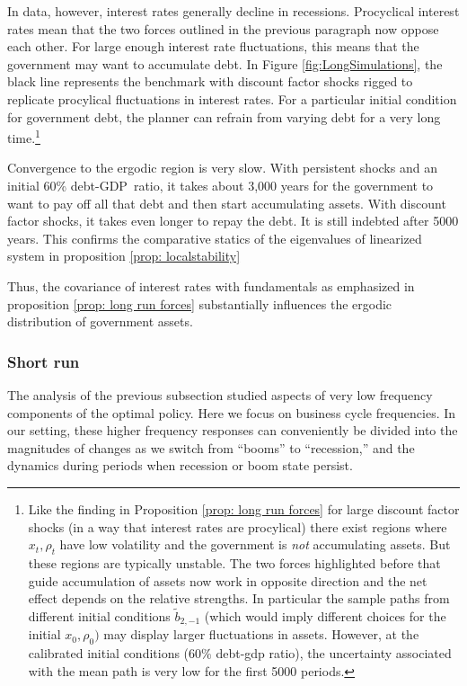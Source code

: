 \documentclass[thmsb,11pt]{article}
\begin{document}
In data, however, interest rates  generally decline in recessions. Procyclical interest rates mean that the
two forces outlined in the previous paragraph now oppose each other.  For  large enough interest rate fluctuations, this means that
the
government may want to accumulate debt. In Figure \ref{fig:LongSimulations}, the
black line represents the benchmark with discount factor shocks rigged to
replicate  procylical fluctuations in interest rates. For a particular initial condition for government debt,
the planner can refrain from varying debt for a very  long time.\footnote{Like the finding in Proposition \ref{prop: long run forces} for large discount factor shocks (in a way that interest rates are procylical)  there exist
regions where $x_t,\rho_t$ have low volatility and the  government is \emph{not} accumulating assets. But these
regions  are typically unstable. The two forces highlighted before that guide accumulation of assets now work in opposite direction and the net effect depends
on the relative strengths. In particular the sample paths from different initial conditions $\tilde{b}_{2,-1}$ (which would imply different choices for the initial $x_0,\rho_0)$ may display larger fluctuations in assets. However, at the calibrated initial conditions ($60\%$ debt-gdp ratio), the uncertainty associated with the mean path is very low for the first 5000 periods.}


Convergence to the ergodic region is  very slow.  With persistent shocks and an initial 60\% debt-GDP\ ratio,  it takes about 3,000 years for
the government to want to pay off all that debt
and then start accumulating assets. With
discount factor shocks, it takes even longer to repay the debt. It is still indebted after 5000 years. This confirms the comparative statics of the eigenvalues of linearized system in proposition \ref{prop: localstability}

Thus, the covariance of interest rates with fundamentals as emphasized in proposition \ref{prop: long run forces} substantially influences the ergodic distribution of government assets.

\subsubsection{Short run}

The analysis of the previous subsection studied  aspects of very low
frequency components of  the optimal policy. Here  we focus on business cycle frequencies.
 In our setting,  these higher frequency responses can conveniently be divided  into the magnitudes of changes as we switch from ``booms''
to ``recession,'' and the dynamics during  periods when recession or boom state persist.
\end{document}

